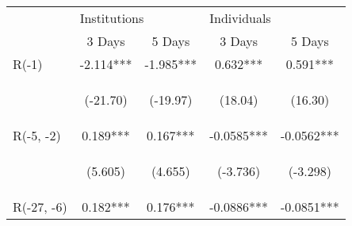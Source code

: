 \documentclass[border=0.2cm]{standalone}
\begin{document}
\begin{tabular}{lcccc}
    \toprule
                        & \multicolumn{2}{l}{Institutions}               & \multicolumn{2}{l}{Individuals}                                                                                                                  \\
    \cmidrule(l){2-3} \cmidrule(l){4-5}
                        & 3 Days                                         & 5 Days                                         & 3 Days                                         & 5 Days                                         \\
    \midrule
    R(-1)               & -2.114***                                      & -1.985***                                      & 0.632***                                       & 0.591***                                       \\
    \vspace{4pt}        & \begin{footnotesize}(-21.70)\end{footnotesize} & \begin{footnotesize}(-19.97)\end{footnotesize} & \begin{footnotesize}(18.04)\end{footnotesize}  & \begin{footnotesize}(16.30)\end{footnotesize}  \\
    R(-5, -2)           & 0.189***                                       & 0.167***                                       & -0.0585***                                     & -0.0562***                                     \\
    \vspace{4pt}        & \begin{footnotesize}(5.605)\end{footnotesize}  & \begin{footnotesize}(4.655)\end{footnotesize}  & \begin{footnotesize}(-3.736)\end{footnotesize} & \begin{footnotesize}(-3.298)\end{footnotesize} \\
    R(-27, -6)          & 0.182***                                       & 0.176***                                       & -0.0886***                                     & -0.0851***                                     \\

\end{tabular}
\end{document}
